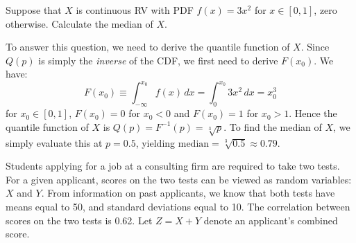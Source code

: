 \documentclass[addpoints,12pt]{exam}\usepackage[]{graphicx}\usepackage[]{color}
\begin{document}
\begin{questions}
\question Suppose that $X$ is continuous RV with PDF $f(x) = 3x^2$ for $x \in [0,1]$, zero otherwise.
  Calculate the median of $X$.
  \begin{solution}
    To answer this question, we need to derive the quantile function of $X$.
    Since $Q(p)$ is simply the \emph{inverse} of the CDF, we first need to derive $F(x_0)$.
    We have:
    \[
      F(x_0) \equiv \int_{-\infty}^{x_0} f(x) \,dx = \int_{0}^{x_0} 3x^2\, dx = x_0^3
    \]
    for $x_0 \in [0,1]$, $F(x_0) = 0$ for $x_0 < 0$ and $F(x_0) = 1$ for $x_0 > 1$.
    Hence the quantile function of $X$ is $Q(p) = F^{-1}(p) = \sqrt[3]{p}$.
    To find the median of $X$, we simply evaluate this at $p = 0.5$, yielding $\text{median} = \sqrt[3]{0.5} \approx 0.79$.
  \end{solution}


  \question Students applying for a job at a consulting firm are required to take two tests. 
  For a given applicant, scores on the two tests can be viewed as random variables: $X$ and $Y$. 
  From information on past applicants, we know that both tests have means equal to 50, and standard deviations equal to 10.
  The correlation between scores on the two tests is 0.62.
  Let $Z = X + Y$ denote an applicant's combined score.
\end{questions}
\end{document}
